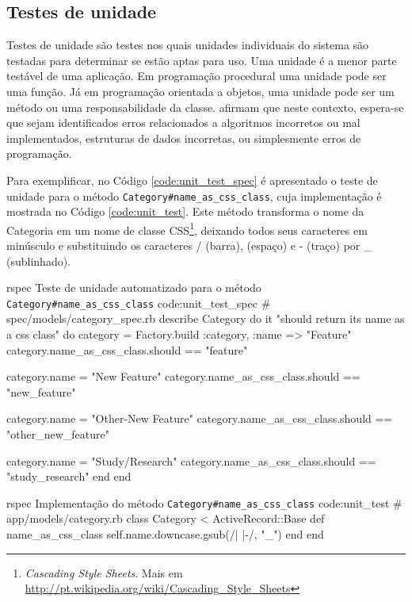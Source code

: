 \subsection{Testes de unidade}
\label{sub:testes_de_unidade}

Testes de unidade são testes nos quais unidades individuais do sistema são testadas para determinar se estão aptas para uso. Uma unidade é a menor parte testável de uma aplicação. Em programação procedural uma unidade pode ser uma função. Já em programação orientada a objetos, uma unidade pode ser um método ou uma responsabilidade da classe.  afirmam que neste contexto, espera-se que sejam identificados erros relacionados a algoritmos incorretos ou mal implementados, estruturas de dados incorretas, ou simplesmente erros de programação.

Para exemplificar, no Código \ref{code:unit_test_spec} é apresentado o teste de unidade para o método \texttt{Category\#name\_as\_css\_class}, cuja implementação é mostrada no Código \ref{code:unit_test}. Este método transforma o nome da Categoria em um nome de classe CSS\footnote{\textit{Cascading Style Sheets}. Mais em \url{http://pt.wikipedia.org/wiki/Cascading_Style_Sheets}}, deixando todos seus caracteres em minúsculo e substituindo os caracteres / (barra),  (espaço) e - (traço) por \_ (sublinhado).

\begin{mycode}{rspec}%
{Teste de unidade automatizado para o método \texttt{Category\#name\_as\_css\_class} }{code:unit_test_spec}
# spec/models/category_spec.rb
describe Category do
  it "should return its name as a css class" do
    category = Factory.build :category, :name => "Feature"
    category.name_as_css_class.should == "feature"

    category.name = "New Feature"
    category.name_as_css_class.should == "new_feature"

    category.name = "Other-New Feature"
    category.name_as_css_class.should == "other_new_feature"

    category.name = "Study/Research"
    category.name_as_css_class.should == "study_research"
  end
end
\end{mycode}

\begin{mycode}{rspec}%
{Implementação do método \texttt{Category\#name\_as\_css\_class} }{code:unit_test}
# app/models/category.rb
class Category < ActiveRecord::Base
  def name_as_css_class
    self.name.downcase.gsub(/\/| |-/, "_")
  end
end
\end{mycode}


